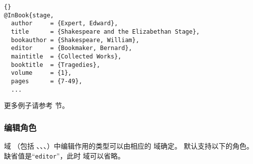 \begin{lstlisting}[style=bibtex]{}
@InBook{stage,
  author     = {Expert, Edward},
  title      = {Shakespeare and the Elizabethan Stage},
  bookauthor = {Shakespeare, William},
  editor     = {Bookmaker, Bernard},
  maintitle  = {Collected Works},
  booktitle  = {Tragedies},
  volume     = {1},
  pages      = {7-49},
  ...
\end{lstlisting}
%
更多例子请参考  节。

\subsubsection{编辑角色}%
\label{bib:use:edr}


 域
（包括 、、、）中编辑作用的类型可以由相应的  域确定。
默认支持以下的角色。
缺省值是“\texttt{editor}”，此时  域可以省略。

